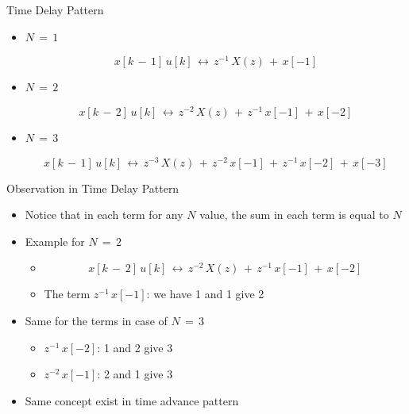 \begin{frame}[t]{Time Delay Pattern}

\begin{itemize}

\item $N \, = \, 1$

\begin{equation*}
x[k \, - \, 1] \, u[k] \,\leftrightarrow \,  z^{-1} \, X(z) \, + \, x[-1]
\end{equation*}

\item $N \, = \, 2$

\begin{equation*}
x[k \, - \, 2] \, u[k] \,\leftrightarrow \,  z^{-2} \, X(z)\, + \, z^{-1} \, x[-1] \, + \, x[-2]
\end{equation*}


\item $N \, = \, 3$

\begin{equation*}
x[k \, - \, 1] \, u[k] \,\leftrightarrow \,  z^{-3} \, X(z)\, + \, z^{-2} \, x[-1] \, + \, z^{-1}\, x[-2] \, + \, x[-3]
\end{equation*}

\end{itemize}

\end{frame}

\begin{frame}[t]{Observation in Time Delay Pattern}

\begin{itemize}

\item Notice that in each term for any $N$ value, the sum in each term is equal to $N$

\item Example for $N \, = \, 2$

	\begin{itemize}
	\item \begin{equation*}
x[k \, - \, 2] \, u[k] \,\leftrightarrow \,  z^{-2} \, X(z)\, + \, z^{-1} \, x[-1] \, + \, x[-2]
\end{equation*}

	\item The term $z^{-1} \, x[-1] $: we have 1 and 1 give 2
	\end{itemize}

\item Same for the terms in case of $N \, = \, 3$

	\begin{itemize}
	\item $z^{-1} \, x[-2] $: 1 and 2 give 3
	
	\item $z^{-2} \, x[-1] $: 2 and 1 give 3
	\end{itemize}

\item Same concept exist in time advance pattern

\end{itemize}

\end{frame}


